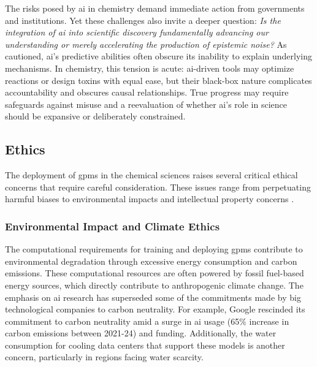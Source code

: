 The risks posed by \gls{ai} in chemistry demand immediate action from governments and institutions. 
Yet these challenges also invite a deeper question: \textit{Is the integration of \gls{ai} into scientific discovery fundamentally advancing our understanding or merely accelerating the production of epistemic noise?} 
As \textcite{narayanan2025why} cautioned, \gls{ai}’s predictive abilities often obscure its inability to explain underlying mechanisms. 
In chemistry, this tension is acute: \gls{ai}-driven tools may optimize reactions or design toxins with equal ease, but their black-box nature complicates accountability and obscures causal relationships. 
True progress may require safeguards against misuse and a reevaluation of whether \gls{ai}’s role in science should be expansive or deliberately constrained.

\subsection{Ethics} \label{sec:ethics}

The deployment of \glspl{gpm} in the chemical sciences raises several critical ethical concerns that require careful consideration. 
These issues range from perpetuating harmful biases to environmental impacts and intellectual property concerns \autocite{crawford2021atlas}.

\subsubsection{Environmental Impact and Climate Ethics}

The computational requirements for training and deploying \glspl{gpm} contribute to environmental degradation through excessive energy consumption and carbon emissions. \autocite{spotte-smith2025considering, nature2023carbon} 
These computational resources are often powered by fossil fuel-based energy sources, which directly contribute to anthropogenic climate change. \autocite{strubell2019energy} 
The emphasis on \gls{ai} research has superseded some of the commitments made by big technological companies to carbon neutrality. 
For example, Google rescinded its commitment to carbon neutrality amid a surge in \gls{ai} usage (65$\%$ increase in carbon emissions between 2021-24) and funding.\autocite{bhuiyan2025google} 
Additionally, the water consumption for cooling data centers that support these models is another concern, particularly in regions facing water scarcity. \autocite{mytton2021data}

